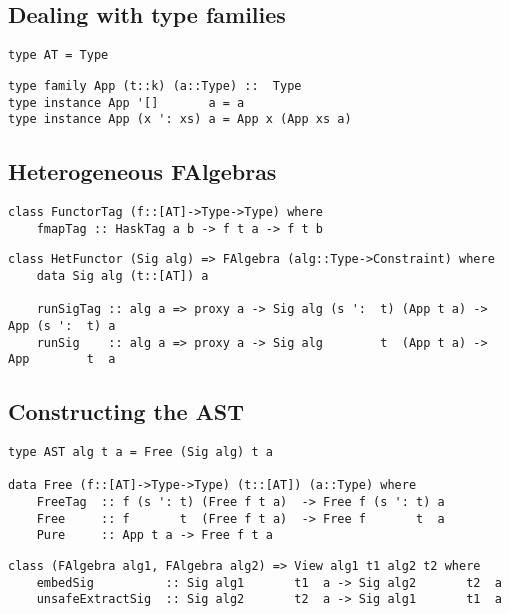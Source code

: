 \documentclass[preprint]{sigplanconf}
\theoremstyle{definition}
\begin{document}
\subsection{Dealing with type families}

\begin{lstlisting}
type AT = Type
\end{lstlisting}

\begin{lstlisting}
type family App (t::k) (a::Type) ::  Type
type instance App '[]       a = a
type instance App (x ': xs) a = App x (App xs a)
\end{lstlisting}

\subsection{Heterogeneous FAlgebras}

\begin{lstlisting}
class FunctorTag (f::[AT]->Type->Type) where
    fmapTag :: HaskTag a b -> f t a -> f t b
\end{lstlisting}

\begin{lstlisting}
class HetFunctor (Sig alg) => FAlgebra (alg::Type->Constraint) where
    data Sig alg (t::[AT]) a

    runSigTag :: alg a => proxy a -> Sig alg (s ':  t) (App t a) -> App (s ':  t) a
    runSig    :: alg a => proxy a -> Sig alg        t  (App t a) -> App        t  a
\end{lstlisting}

\subsection{Constructing the AST}

\begin{lstlisting}
type AST alg t a = Free (Sig alg) t a

data Free (f::[AT]->Type->Type) (t::[AT]) (a::Type) where
    FreeTag  :: f (s ': t) (Free f t a)  -> Free f (s ': t) a
    Free     :: f       t  (Free f t a)  -> Free f       t  a
    Pure     :: App t a -> Free f t a
\end{lstlisting}

\begin{lstlisting}
class (FAlgebra alg1, FAlgebra alg2) => View alg1 t1 alg2 t2 where
    embedSig          :: Sig alg1       t1  a -> Sig alg2       t2  a
    unsafeExtractSig  :: Sig alg2       t2  a -> Sig alg1       t1  a
\end{lstlisting}
\end{document}
